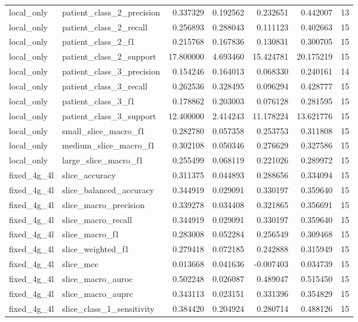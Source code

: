 \begin{tabular}{llrrrrr}
local_only & patient_class_2_precision & 0.337329 & 0.192562 & 0.232651 & 0.442007 & 13 \\
local_only & patient_class_2_recall & 0.256893 & 0.288043 & 0.111123 & 0.402663 & 15 \\
local_only & patient_class_2_f1 & 0.215768 & 0.167836 & 0.130831 & 0.300705 & 15 \\
local_only & patient_class_2_support & 17.800000 & 4.693460 & 15.424781 & 20.175219 & 15 \\
local_only & patient_class_3_precision & 0.154246 & 0.164013 & 0.068330 & 0.240161 & 14 \\
local_only & patient_class_3_recall & 0.262536 & 0.328495 & 0.096294 & 0.428777 & 15 \\
local_only & patient_class_3_f1 & 0.178862 & 0.203003 & 0.076128 & 0.281595 & 15 \\
local_only & patient_class_3_support & 12.400000 & 2.414243 & 11.178224 & 13.621776 & 15 \\
local_only & small_slice_macro_f1 & 0.282780 & 0.057358 & 0.253753 & 0.311808 & 15 \\
local_only & medium_slice_macro_f1 & 0.302108 & 0.050346 & 0.276629 & 0.327586 & 15 \\
local_only & large_slice_macro_f1 & 0.255499 & 0.068119 & 0.221026 & 0.289972 & 15 \\
fixed_4g_4l & slice_accuracy & 0.311375 & 0.044893 & 0.288656 & 0.334094 & 15 \\
fixed_4g_4l & slice_balanced_accuracy & 0.344919 & 0.029091 & 0.330197 & 0.359640 & 15 \\
fixed_4g_4l & slice_macro_precision & 0.339278 & 0.034408 & 0.321865 & 0.356691 & 15 \\
fixed_4g_4l & slice_macro_recall & 0.344919 & 0.029091 & 0.330197 & 0.359640 & 15 \\
fixed_4g_4l & slice_macro_f1 & 0.283008 & 0.052284 & 0.256549 & 0.309468 & 15 \\
fixed_4g_4l & slice_weighted_f1 & 0.279418 & 0.072185 & 0.242888 & 0.315949 & 15 \\
fixed_4g_4l & slice_mcc & 0.013668 & 0.041636 & -0.007403 & 0.034739 & 15 \\
fixed_4g_4l & slice_macro_auroc & 0.502248 & 0.026087 & 0.489047 & 0.515450 & 15 \\
fixed_4g_4l & slice_macro_auprc & 0.343113 & 0.023151 & 0.331396 & 0.354829 & 15 \\
fixed_4g_4l & slice_class_1_sensitivity & 0.384420 & 0.204924 & 0.280714 & 0.488126 & 15 \\

\end{tabular}
